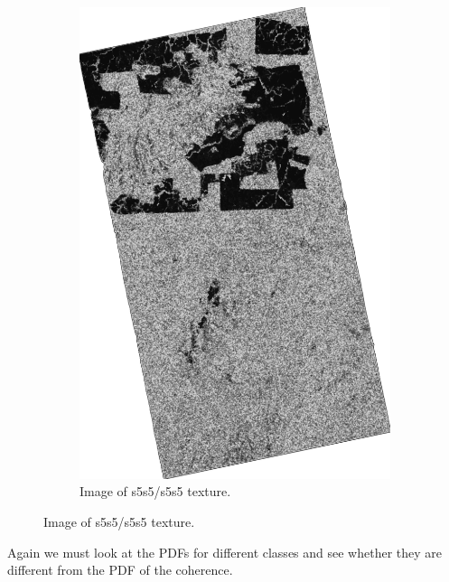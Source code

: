 \begin{figure}[H]\ContinuedFloat
  \centering
  \begin{subfigure}[b]{0.4\linewidth}
    \includegraphics[width=\linewidth]{Chapter4/laws_textures/s5s5_s5s5image.png}
     \caption{Image of s5s5/s5s5 texture.}
  \end{subfigure}
\end{figure}
Again we must look at the PDFs for different classes and see whether they are different from the PDF of the coherence.

